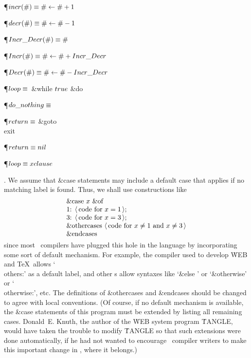 \Y\P\D {}$\\{incr}(\#)\S\#\K\#+1$\par
\P\D {}$\\{decr}(\#)\S\#\K\#-1$\par
\P\D {}$\\{Incr\_Decr}(\#)\S\#$\par
\P\D {}$\\{Incr}(\#)\S\#\K\#+\\{Incr\_Decr}$\par
\P\D {}$\\{Decr}(\#)\S\#\K\#-\\{Incr\_Decr}$\par
\P\D {}$\\{loop}\S$\ \&{while} $\\{true}$ \1\&{do}\ \par
\P\D {}$\\{do\_nothing}\S$\par
\P\D {}$\\{return}\S$\1\5
\&{goto} \\{exit}\2\par
\P\F {}$\\{return}\S\\{nil}$\par
\P\F {}$\\{loop}\S\\{xclause}$\par
\fi

. We assume that   \&{case}  statements may include a default case that
applies
if no matching label is found. Thus, we shall use constructions like
$$\vbox{\halign{#\hfil\cr
 \&{case} $\|x$ \&{of}\cr
1: $\langle\,$code for $x=1\,\rangle$;\cr
3: $\langle\,$code for $x=3\,\rangle$;\cr
 \&{othercases}  $\langle\,$code for $\|x\I1$ and $\|x\I3$$\,\rangle$\cr
  \&{endcases} \cr}}$$
since most \PASCAL\ compilers have plugged this hole in the language by
incorporating some sort of default mechanism. For example, the compiler
used to develop \.{WEB} and \TeX\ allows `\\{others}:' as a default label,
and other \PASCAL s allow syntaxes like `\ignorespaces \&{else} \unskip' or
`\&{otherwise}' or `\\{otherwise}:', etc. The definitions of  \&{othercases}
and   \&{endcases}  should be changed to agree with local conventions. (Of
course, if no default mechanism is available, the   \&{case}  statements of
this program must be extended by listing all remaining cases.
Donald~E. Knuth, the author of the \.{WEB} system program \.{TANGLE},
would have taken the trouble to modify \.{TANGLE} so that such extensions
were done automatically, if he had not wanted to encourage \PASCAL\
compiler writers to make this important change in \PASCAL, where it belongs.)

